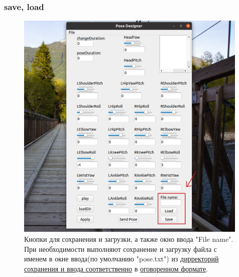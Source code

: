 \documentclass[12pt,a4paper]{article}
\begin{document}
\subsubsection{save, load}
\label{saveLoad}
\begin{figure}[h!]
    \centering
    \includegraphics[width=0.99\textwidth]{images/loadSave.png}
    \caption{Кнопки для сохранения и загрузки, а также окно ввода "File name". При необходимости выполняют сохранение и загрузку файла с именем в окне ввода(по умолчанию "pose.txt") из \hyperref[file]{дирректорий сохранения и ввода соответственно} в \hyperref[messageView]{оговоренном формате}.}
    \label{fig:file}
\end{figure}
\newpage
\end{document}
